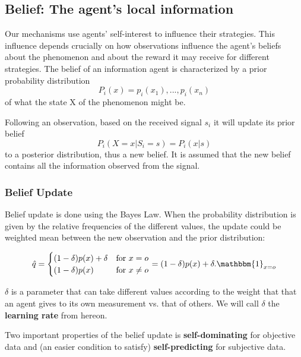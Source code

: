 \documentclass{report}
\theoremstyle{definition}
\begin{document}
\subsection{Belief: The agent's local information}
Our mechanisms use agents' self-interest to influence their strategies. This influence depends crucially on how observations influence the agent’s beliefs about the phenomenon and about the reward it may receive for different strategies. The belief of an information agent is characterized by a prior probability distribution 
\begin{equation}
    P_i(x) = {p_i(x_1), ..., p_i(x_n)}
\end{equation}
of what the state X of the phenomenon might be.

Following an observation, based on the received signal $s_i$ it will update its prior belief
\begin{equation}
    P_i(X=x | S_i = s) = P_i(x|s)
\end{equation}
to a posterior distribution, thus a new belief. It is assumed that the new belief contains all the information observed from the signal.

\subsubsection{Belief Update}
Belief update is done using the Bayes Law. When the probability distribution is given by the relative frequencies of the different values, the update could be weighted mean between the new observation and the prior distribution:

\begin{equation}
\label{eq:linear_belief_update}
    \hat{q} = \begin{cases} 
(1-\delta)p(x) + \delta &\text{for } x=o \\
(1 - \delta)p(x)        &\text{for } x\neq o 
\end{cases} = (1 - \delta)p(x) + \delta.\mathbbm{1}_{x=o}
\end{equation}

$\delta$ is a parameter that can take different values according to the weight that that an agent gives to its own measurement vs. that of others. We will call $\delta$ the \textbf{learning rate} from hereon. 

Two important properties of the belief update is \textbf{self-dominating} for objective data and (an easier condition to satisfy) \textbf{self-predicting} for subjective data.
\end{document}
